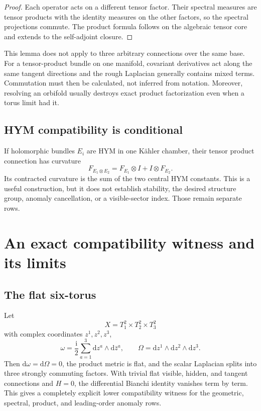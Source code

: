 \documentclass[11pt]{article}
\theoremstyle{definition}
\theoremstyle{remark}
\newcommand{\dd}{\mathrm d}
\newcommand{\ii}{\mathrm i}
\begin{document}
\begin{proof}
Each operator acts on a different tensor factor.  Their spectral measures
are tensor products with the identity measures on the other factors, so the
spectral projections commute.  The product formula follows on the algebraic
tensor core and extends to the self-adjoint closure.
\end{proof}

This lemma does not apply to three arbitrary connections over the same base.
For a tensor-product bundle on one manifold, covariant derivatives act along
the same tangent directions and the rough Laplacian generally contains mixed
terms.  Commutation must then be calculated, not inferred from notation.
Moreover, resolving an orbifold usually destroys exact product
factorization even when a torus limit had it.

\subsection{HYM compatibility is conditional}

If holomorphic bundles \(E_i\) are HYM in one K\"ahler chamber, their tensor
product connection has curvature
\[
F_{E_1\otimes E_2}
=F_{E_1}\otimes I+I\otimes F_{E_2}.
\]
Its contracted curvature is the sum of the two central HYM constants.  This
is a useful construction, but it does not establish stability, the desired
structure group, anomaly cancellation, or a visible-sector index.  Those
remain separate rows.

\section{An exact compatibility witness and its limits}
\label{sec:witness}

\subsection{The flat six-torus}

Let
\[
X=T^2_1\times T^2_2\times T^2_3
\]
with complex coordinates \(z^1,z^2,z^3\),
\[
\omega=\frac{\ii}{2}\sum_{a=1}^3\dd z^a\wedge\dd\bar z^a,
\qquad
\Omega=\dd z^1\wedge\dd z^2\wedge\dd z^3.
\]
Then \(\dd\omega=\dd\Omega=0\), the product metric is flat, and the scalar
Laplacian splits into three strongly commuting factors.  With trivial flat
visible, hidden, and tangent connections and \(H=0\), the differential
Bianchi identity vanishes term by term.  This gives a completely explicit
lower compatibility witness for the geometric, spectral, product, and
leading-order anomaly rows.
\end{document}
